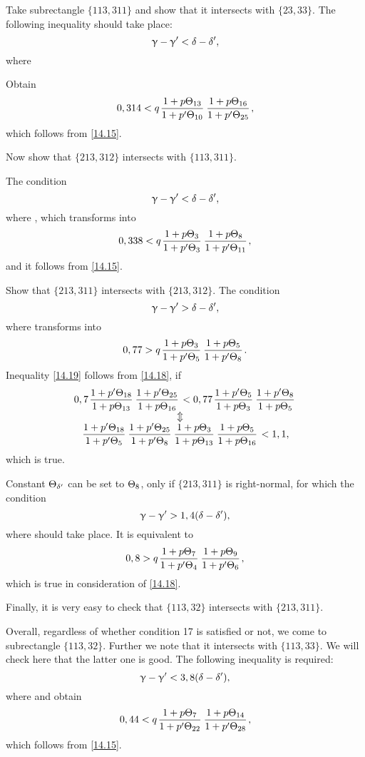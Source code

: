 Take subrectangle $\{113, 311\}$ and show that it intersects with $\{23, 33\}$.
The following inequality should take place:
\begin{equation*}
	\upgamma - \upgamma' < \delta - \delta',
\end{equation*}
where

Obtain
\begin{equation*}
	0,314 < q \up{13}{10} \up{16}{25},
\end{equation*}
which follows from \ref{14.15}.

Now show that $\{213, 312\}$ intersects with $\{113, 311\}$.

The condition
\begin{equation*}
	\upgamma - \upgamma' < \delta - \delta',
\end{equation*}
where
,
which transforms into
\begin{equation*}
	0,338 < q \up{3}{3} \up{8}{11},
\end{equation*}
and it follows from \ref{14.15}.

Show that $\{213, 311\}$ intersects with $\{213, 312\}$.
The condition
\begin{equation*}
	\upgamma - \upgamma' > \delta - \delta',
\end{equation*}
where
transforms into
\begin{equation}\label{14.19}
	0,77 > q \up{3}{5} \up{5}{8}.
\end{equation}
Inequality \ref{14.19} follows from \ref{14.18}, if
\begin{gather*}
	0,7 \pu{18}{13} \pu{25}{16} < 0,77 \pu{5}{3} \pu{8}{5}\\
	\ArrowBetweenLines
	\pp{18}{5} \pp{25}{8} \uu{3}{13} \uu{5}{16} < 1,1,
\end{gather*}
which is true.

Constant $\Theta_{\delta'}$ can be set to $\Theta_{8}$, only if $\{213, 311\}$ is right-normal, for which the condition
\begin{equation*}
	\upgamma - \upgamma' > 1,4 (\delta - \delta'),
\end{equation*}
where
should take place.
It is equivalent to
\begin{equation*}
	0,8 > q \up{7}{4} \up{9}{6},
\end{equation*}
which is true in consideration of \ref{14.18}.

Finally, it is very easy to check that $\{113, 32\}$ intersects with $\{213, 311\}$.

Overall, regardless of whether condition 17 is satisfied or not, we come to subrectangle $\{113, 32\}$.
Further we note that it intersects with $\{113, 33\}$.
We will check here that the latter one is good.
The following inequality is required:
\begin{equation*}
	\upgamma - \upgamma' < 3,8 (\delta - \delta'),
\end{equation*}
where
and obtain
\begin{equation*}
	0,44 < q \up{7}{22} \up{14}{28},
\end{equation*}
which follows from \ref{14.15}.

